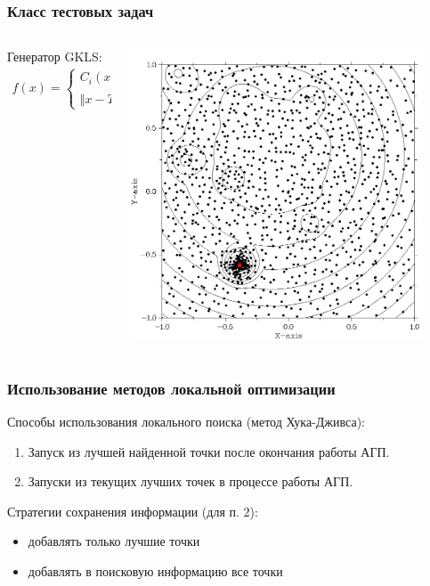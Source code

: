 \documentclass[aspectratio=1610]{beamer}
\begin{document}
\begin{frame}
  \frametitle{Класс тестовых задач}
  \begin{columns}
    \begin{column}{0.5\textwidth}
      Генератор GKLS:
      \begin{displaymath}
        \begin{matrix}
          f(x)=
          \left\{
          \begin{matrix}
          C_i(x), x \in S_i, i\in 2,\dots ,m \\
          \Vert x-T \Vert^2 + t, x\not\in S_2,\dots,S_m
          \end{matrix} \right.
        \end{matrix}
      \end{displaymath}
    \end{column}
    \begin{column}{0.5\textwidth}
      \centerline{\includegraphics[width=0.9\textwidth]{gkls_loc.png}}
    \end{column}
\end{columns}
\end{frame}

\begin{frame}
\frametitle{Использование методов локальной оптимизации}
Способы использования локального поиска (метод Хука-Дживса):\
\begin{enumerate}
  \item Запуск из лучшей найденной точки после окончания работы АГП.
  \item Запуски из текущих лучших точек в процессе работы АГП.
\end{enumerate}
\bigbreak
Стратегии сохранения информации (для п. 2):
\begin{itemize}
  \item добавлять только лучшие точки
  \item добавлять в поисковую информацию все точки
\end{itemize}
\end{frame}
\end{document}
